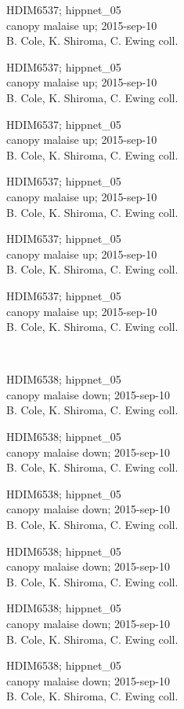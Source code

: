 \documentclass[2pt]{extarticle}
\begin{document}
\noindent
\parbox{0.16\textwidth}{\tiny \raggedright \rule[-0.3\baselineskip]{0pt}{10pt}HDIM6537; hippnet\_05\\ canopy malaise up; 2015-sep-10\\ B. Cole, K. Shiroma, C. Ewing coll.}
\parbox{0.16\textwidth}{\tiny \raggedright \rule[-0.3\baselineskip]{0pt}{10pt}HDIM6537; hippnet\_05\\ canopy malaise up; 2015-sep-10\\ B. Cole, K. Shiroma, C. Ewing coll.}
\parbox{0.16\textwidth}{\tiny \raggedright \rule[-0.3\baselineskip]{0pt}{10pt}HDIM6537; hippnet\_05\\ canopy malaise up; 2015-sep-10\\ B. Cole, K. Shiroma, C. Ewing coll.}
\parbox{0.16\textwidth}{\tiny \raggedright \rule[-0.3\baselineskip]{0pt}{10pt}HDIM6537; hippnet\_05\\ canopy malaise up; 2015-sep-10\\ B. Cole, K. Shiroma, C. Ewing coll.}
\parbox{0.16\textwidth}{\tiny \raggedright \rule[-0.3\baselineskip]{0pt}{10pt}HDIM6537; hippnet\_05\\ canopy malaise up; 2015-sep-10\\ B. Cole, K. Shiroma, C. Ewing coll.}
\parbox{0.16\textwidth}{\tiny \raggedright \rule[-0.3\baselineskip]{0pt}{10pt}HDIM6537; hippnet\_05\\ canopy malaise up; 2015-sep-10\\ B. Cole, K. Shiroma, C. Ewing coll.} \\ 
\vspace{0.001in} 

\noindent
\parbox{0.16\textwidth}{\tiny \raggedright \rule[-0.3\baselineskip]{0pt}{10pt}HDIM6538; hippnet\_05\\ canopy malaise down; 2015-sep-10\\ B. Cole, K. Shiroma, C. Ewing coll.}
\parbox{0.16\textwidth}{\tiny \raggedright \rule[-0.3\baselineskip]{0pt}{10pt}HDIM6538; hippnet\_05\\ canopy malaise down; 2015-sep-10\\ B. Cole, K. Shiroma, C. Ewing coll.}
\parbox{0.16\textwidth}{\tiny \raggedright \rule[-0.3\baselineskip]{0pt}{10pt}HDIM6538; hippnet\_05\\ canopy malaise down; 2015-sep-10\\ B. Cole, K. Shiroma, C. Ewing coll.}
\parbox{0.16\textwidth}{\tiny \raggedright \rule[-0.3\baselineskip]{0pt}{10pt}HDIM6538; hippnet\_05\\ canopy malaise down; 2015-sep-10\\ B. Cole, K. Shiroma, C. Ewing coll.}
\parbox{0.16\textwidth}{\tiny \raggedright \rule[-0.3\baselineskip]{0pt}{10pt}HDIM6538; hippnet\_05\\ canopy malaise down; 2015-sep-10\\ B. Cole, K. Shiroma, C. Ewing coll.}
\parbox{0.16\textwidth}{\tiny \raggedright \rule[-0.3\baselineskip]{0pt}{10pt}HDIM6538; hippnet\_05\\ canopy malaise down; 2015-sep-10\\ B. Cole, K. Shiroma, C. Ewing coll.} \\ 
\vspace{0.001in} 
\end{document}
